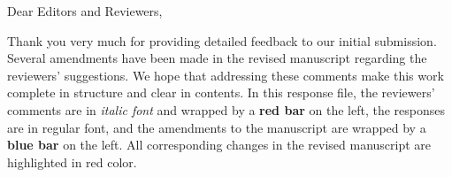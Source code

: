 

\quad\newline
\noindent Dear Editors and Reviewers,

Thank you very much for providing detailed feedback to our initial submission. 
Several amendments have been made in the revised manuscript regarding the reviewers' suggestions. 
We hope that addressing these comments make this work complete in structure and clear in contents. 
In this response file, 
the reviewers' comments are in \textit{italic font} and wrapped by a \textbf{{\color{ReviewerRed}red bar}} on the left,
the responses are in regular font,
and the amendments to the manuscript are wrapped by a \textbf{{\color{AmendmentBlue}blue bar}} on the left.
All corresponding changes in the revised manuscript are highlighted in {\color{ReviewerRed}red color}.
